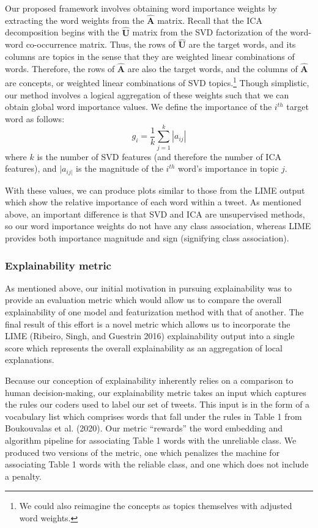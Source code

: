 \documentclass{article}
\begin{document}
Our proposed framework involves obtaining word importance weights by
extracting the word weights from the \(\mathbf{\hat{A}}\) matrix. Recall
that the ICA decomposition begins with the \(\mathbf{\hat{U}}\) matrix
from the SVD factorization of the word-word co-occurrence matrix. Thus,
the rows of \(\mathbf{\hat{U}}\) are the target words, and its columns
are topics in the sense that they are weighted linear combinations of
words. Therefore, the rows of \(\mathbf{\hat{A}}\) are also the target
words, and the columns of \(\mathbf{\hat{A}}\) are concepts, or weighted
linear combinations of SVD topics.\footnote{We could also reimagine the
  concepts as topics themselves with adjusted word weights.} Though
simplistic, our method involves a logical aggregation of these weights
such that we can obtain global word importance values. We define the
importance of the \(i^{th}\) target word as follows:
\[g_i = \frac {1}{k} \sum_{j=1}^{k}{|a_{ij}|}\] where \(k\) is the
number of SVD features (and therefore the number of ICA features), and
\(|a_{ij|}\) is the magnitude of the \(i^{th}\) word's importance in
topic \(j\).

With these values, we can produce plots similar to those from the LIME
output which show the relative importance of each word within a tweet.
As mentioned above, an important difference is that SVD and ICA are
unsupervised methods, so our word importance weights do not have any
class association, whereas LIME provides both importance magnitude and
sign (signifying class association).

\hypertarget{explainability-metric}{%
\subsubsection{Explainability metric}\label{explainability-metric}}

As mentioned above, our initial motivation in pursuing explainability
was to provide an evaluation metric which would allow us to compare the
overall explainability of one model and featurization method with that
of another. The final result of this effort is a novel metric which
allows us to incorporate the LIME (Ribeiro, Singh, and Guestrin 2016)
explainability output into a single score which represents the overall
explainability as an aggregation of local explanations.

Because our conception of explainability inherently relies on a
comparison to human decision-making, our explainability metric takes an
input which captures the rules our coders used to label our set of
tweets. This input is in the form of a vocabulary list which comprises
words that fall under the rules in Table 1 from Boukouvalas et al.
(2020). Our metric ``rewards'' the word embedding and algorithm pipeline
for associating Table 1 words with the unreliable class. We produced two
versions of the metric, one which penalizes the machine for associating
Table 1 words with the reliable class, and one which does not include a
penalty.
\end{document}
